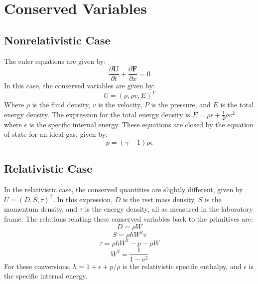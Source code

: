 \section{Conserved Variables}

\subsection{Nonrelativistic Case}
The euler equations are given by:
$$\frac{\partial \bm{U}}{\partial t}+\frac{\partial \bm{F}}{\partial x}=0$$
In this case, the conserved variables are given by:
$$U=(\rho , \rho v , E)^T$$
Where $\rho$ is the fluid density, $v$ is the velocity, $P$ is the pressure, and $E$ is the total energy density. The expression for the total energy density is $E=\rho \epsilon + \frac{1}{2} \rho v^2$ where $\epsilon$ is the specific internal energy. These equations are closed by the equation of state for an ideal gas, given by:
$$p=(\gamma-1)\rho \epsilon$$

\subsection{Relativistic Case}
In the relativistic case, the conserved quantities are slightly different, given by $U=(D,S,\tau)^T$. In this expression, $D$ is the rest mass density, $S$ is the momentum density, and $\tau$ is the energy density, all as measured in the laboratory frame. The relations relating these conserved variables back to the primitives are:
$$D= \rho W$$
$$S = \rho h W^2 v$$
$$\tau = \rho h W^2 - p - \rho W $$
$$W^2 = \frac{1}{1-v^2}$$
For these conversions, $h=1+\epsilon +p / \rho$ is the relativistic specific enthalpy, and $\epsilon$ is the specific internal energy. 
